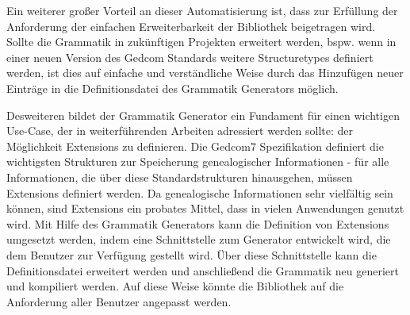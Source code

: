 Ein weiterer großer Vorteil an dieser Automatisierung ist, dass zur Erfüllung der Anforderung der einfachen Erweiterbarkeit der Bibliothek beigetragen wird. Sollte die Grammatik in zukünftigen Projekten erweitert werden, bspw. wenn in einer neuen Version des Gedcom Standards weitere Structuretypes definiert werden, ist dies auf einfache und verständliche Weise durch das Hinzufügen neuer Einträge in die Definitionsdatei des Grammatik Generators möglich. 


Desweiteren bildet der Grammatik Generator ein Fundament für einen wichtigen Use-Case, der in weiterführenden Arbeiten adressiert werden sollte: der Möglichkeit Extensions zu definieren. Die Gedcom7 Spezifikation definiert die wichtigsten Strukturen zur Speicherung genealogischer Informationen - für alle Informationen, die über diese Standardstrukturen hinausgehen, müssen Extensions definiert werden. Da genealogische Informationen sehr vielfältig sein können, sind Extensions ein probates Mittel, dass in vielen Anwendungen genutzt wird. Mit Hilfe des Grammatik Generators kann die Definition von Extensions umgesetzt werden, indem eine Schnittstelle zum Generator entwickelt wird, die dem Benutzer zur Verfügung gestellt wird. Über diese Schnittstelle kann die Definitionsdatei erweitert werden und anschließend die Grammatik neu generiert und kompiliert werden. Auf diese Weise könnte die Bibliothek auf die Anforderung aller Benutzer angepasst werden. 
